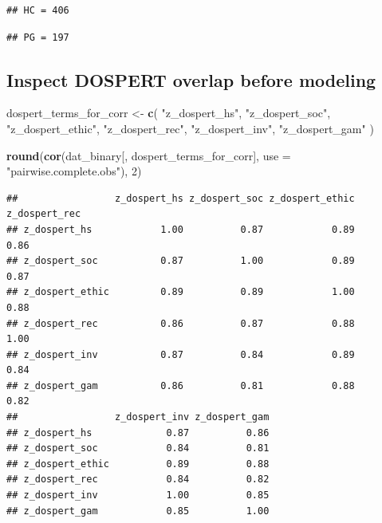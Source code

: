 \documentclass[
]{article}
\newenvironment{Shaded}{\begin{snugshade}}{\end{snugshade}}
\newcommand{\AttributeTok}[1]{\textcolor[rgb]{0.13,0.29,0.53}{#1}}
\newcommand{\DecValTok}[1]{\textcolor[rgb]{0.00,0.00,0.81}{#1}}
\newcommand{\FunctionTok}[1]{\textcolor[rgb]{0.13,0.29,0.53}{\textbf{#1}}}
\newcommand{\NormalTok}[1]{#1}
\newcommand{\OtherTok}[1]{\textcolor[rgb]{0.56,0.35,0.01}{#1}}
\newcommand{\SpecialCharTok}[1]{\textcolor[rgb]{0.81,0.36,0.00}{\textbf{#1}}}
\newcommand{\StringTok}[1]{\textcolor[rgb]{0.31,0.60,0.02}{#1}}
\begin{document}
\begin{verbatim}
## HC = 406
\end{verbatim}

\begin{Shaded}
\end{Shaded}

\begin{verbatim}
## PG = 197
\end{verbatim}

\subsection{Inspect DOSPERT overlap before
modeling}\label{inspect-dospert-overlap-before-modeling}

\begin{Shaded}
\begin{Highlighting}[]
\NormalTok{dospert\_terms\_for\_corr }\OtherTok{\textless{}{-}} \FunctionTok{c}\NormalTok{(}
  \StringTok{"z\_dospert\_hs"}\NormalTok{, }\StringTok{"z\_dospert\_soc"}\NormalTok{, }\StringTok{"z\_dospert\_ethic"}\NormalTok{, }\StringTok{"z\_dospert\_rec"}\NormalTok{, }\StringTok{"z\_dospert\_inv"}\NormalTok{, }\StringTok{"z\_dospert\_gam"}
\NormalTok{)}

\FunctionTok{round}\NormalTok{(}\FunctionTok{cor}\NormalTok{(dat\_binary[, dospert\_terms\_for\_corr], }\AttributeTok{use =} \StringTok{"pairwise.complete.obs"}\NormalTok{), }\DecValTok{2}\NormalTok{)}
\end{Highlighting}
\end{Shaded}

\begin{verbatim}
##                 z_dospert_hs z_dospert_soc z_dospert_ethic z_dospert_rec
## z_dospert_hs            1.00          0.87            0.89          0.86
## z_dospert_soc           0.87          1.00            0.89          0.87
## z_dospert_ethic         0.89          0.89            1.00          0.88
## z_dospert_rec           0.86          0.87            0.88          1.00
## z_dospert_inv           0.87          0.84            0.89          0.84
## z_dospert_gam           0.86          0.81            0.88          0.82
##                 z_dospert_inv z_dospert_gam
## z_dospert_hs             0.87          0.86
## z_dospert_soc            0.84          0.81
## z_dospert_ethic          0.89          0.88
## z_dospert_rec            0.84          0.82
## z_dospert_inv            1.00          0.85
## z_dospert_gam            0.85          1.00
\end{verbatim}
\end{document}
